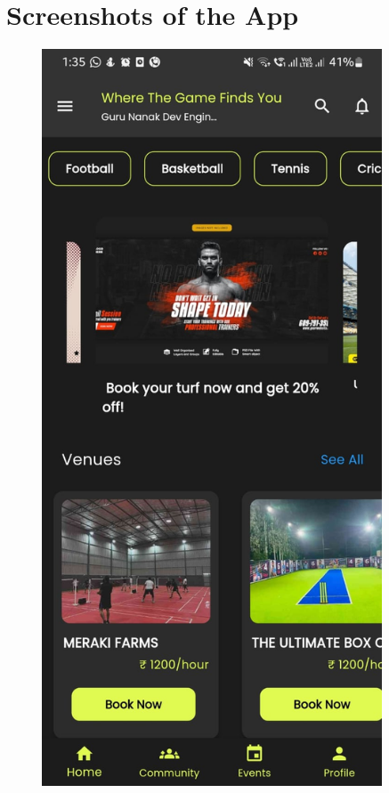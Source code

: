 \documentclass[12pt,a4paper]{report}
\begin{document}
\section{Screenshots of the App}
\begin{figure}[H]
    \centering
    \begin{minipage}[t]{0.3\textwidth}
        \centering
        \includegraphics[width=0.9\textwidth]{assets/screenshot1.jpeg}

\end{minipage}
\end{figure}
\end{document}
